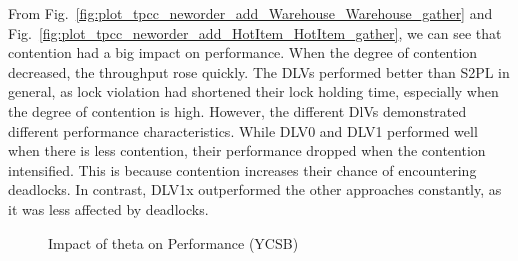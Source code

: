 \documentclass[conference]{IEEEtran}
\begin{document}
From Fig.~\ref{fig:plot_tpcc_neworder_add_Warehouse_Warehouse_gather} and
Fig.~\ref{fig:plot_tpcc_neworder_add_HotItem_HotItem_gather},
we can see that contention had a big impact on performance. When the degree of contention decreased, the throughput rose quickly.
The DLVs performed better than S2PL in general, as lock violation had shortened their lock holding time, especially when the degree of contention is high.
However, the different DlVs demonstrated different performance characteristics. 
While DLV0 and DLV1 performed well when there is less contention, their performance dropped when the contention intensified.
This is because contention increases their chance of encountering deadlocks.
In contrast, DLV1x outperformed the other approaches constantly, as it was less affected by deadlocks.

\begin{figure}[tbp]
  \centering


\caption{Impact of theta on Performance (YCSB)}
\label{fig:plot_ycsb_add_Theta_Theta_TPM_gather}
\end{figure}
\end{document}
